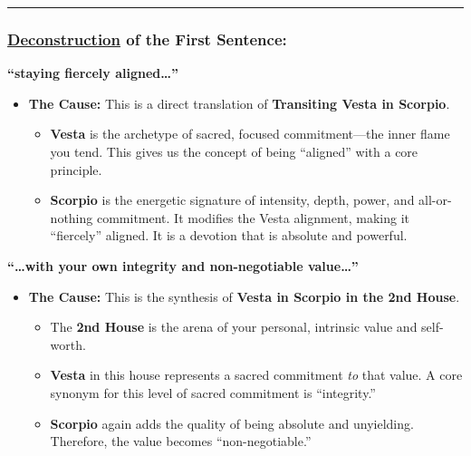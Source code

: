 \documentclass{article}
\begin{document}
\begin{center}\rule{0.5\linewidth}{0.5pt}\end{center}

\subsubsection*{\hyperlink{gloss:deconstruction}{Deconstruction} of the First Sentence:}\label{deconstruction-of-the-first-sentence}

\textbf{``staying fiercely aligned\ldots{}''}

\begin{itemize}
\tightlist
\item
  \textbf{The Cause:} This is a direct translation of \textbf{Transiting Vesta in Scorpio}.

  \begin{itemize}
  \tightlist
  \item
    \textbf{Vesta} is the archetype of sacred, focused commitment---the inner flame you tend. This gives us the concept of being ``aligned'' with a core principle.
  \item
    \textbf{Scorpio} is the energetic signature of intensity, depth, power, and all-or-nothing commitment. It modifies the Vesta alignment, making it ``fiercely'' aligned. It is a devotion that is absolute and powerful.
  \end{itemize}
\end{itemize}

\textbf{``\ldots with your own integrity and non-negotiable value\ldots{}''}

\begin{itemize}
\tightlist
\item
  \textbf{The Cause:} This is the synthesis of \textbf{Vesta in Scorpio in the 2nd House}.

  \begin{itemize}
  \tightlist
  \item
    The \textbf{2nd House} is the arena of your personal, intrinsic value and self-worth.
  \item
    \textbf{Vesta} in this house represents a sacred commitment \emph{to} that value. A core synonym for this level of sacred commitment is ``integrity.''
  \item
    \textbf{Scorpio} again adds the quality of being absolute and unyielding. Therefore, the value becomes ``non-negotiable.''
  \end{itemize}
\end{itemize}
\end{document}
